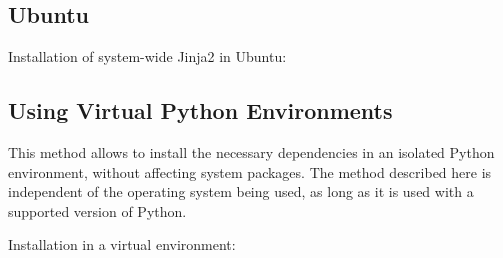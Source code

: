 \documentclass[letterpaper,10pt,english]{sphinxmanual}
\begin{document}
\subsection{Ubuntu}
\label{\detokenize{installation:ubuntu}}
Installation of system-wide Jinja2 in Ubuntu:

\begin{sphinxVerbatim}[commandchars=\\\{\}]
     
\end{sphinxVerbatim}


\subsection{Using Virtual Python Environments}
\label{\detokenize{installation:using-virtual-python-environments}}
This method allows to install the necessary dependencies in an isolated Python
environment, without affecting system packages. The method described here is
independent of the operating system being used, as long as it is used with
a supported version of Python.

Installation in a virtual environment:

\begin{sphinxVerbatim}[commandchars=\\\{\}]
  

 

        
  
  
  

 
\end{sphinxVerbatim}
\end{document}
